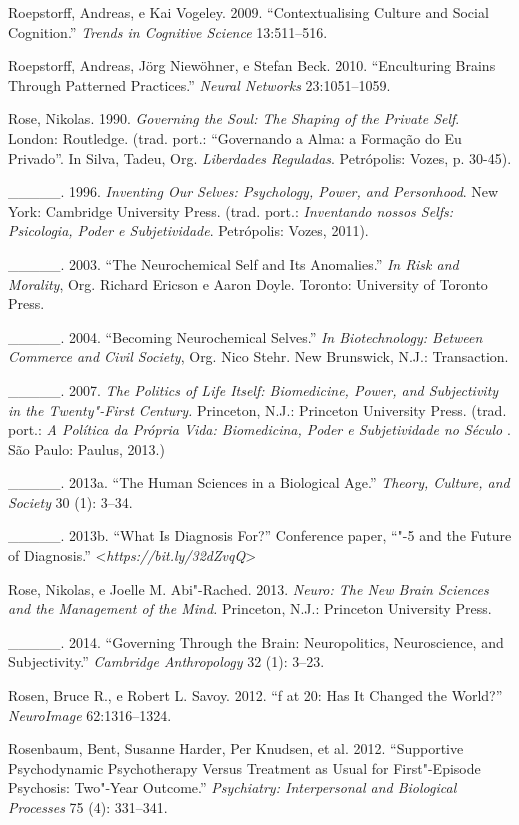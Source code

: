 {\begin{Parskip}
Roepstorff, Andreas, e Kai Vogeley. 2009. ``Contextualising Culture and
Social Cognition.'' \emph{Trends in Cognitive Science} 13:511--516.

Roepstorff, Andreas, Jörg Niewöhner, e Stefan Beck. 2010. ``Enculturing
Brains Through Patterned Practices.'' \emph{Neural Networks}
23:1051--1059.

Rose, Nikolas. 1990. \emph{Governing the Soul: The Shaping of the
Private Self}. London: Routledge. (trad. port.: ``Governando a Alma: a
Formação do Eu Privado''. In Silva, Tadeu, Org. \emph{Liberdades
Reguladas}. Petrópolis: Vozes, p. 30-45).

\_\_\_\_\_. 1996. \emph{Inventing Our Selves: Psychology, Power, and
Personhood}. New York: Cambridge University Press. (trad. port.:
\emph{Inventando nossos Selfs: Psicologia, Poder e Subjetividade}.
Petrópolis: Vozes, 2011).

\_\_\_\_\_. 2003. ``The Neurochemical Self and Its Anomalies.'' \emph{In
Risk and Morality}, Org. Richard Ericson e Aaron Doyle. Toronto:
University of Toronto Press.

\_\_\_\_\_. 2004. ``Becoming Neurochemical Selves.'' \emph{In
Biotechnology: Between Commerce and Civil Society}, Org. Nico Stehr. New
Brunswick, N.J.: Transaction.

\_\_\_\_\_. 2007. \emph{The Politics of Life Itself: Biomedicine, Power,
and Subjectivity in the Twenty"-First Century.} Princeton, N.J.:
Princeton University Press. (trad. port.: \emph{A Política da Própria
Vida: Biomedicina, Poder e Subjetividade no Século }. São Paulo:
Paulus, 2013.)

\_\_\_\_\_. 2013a. ``The Human Sciences in a Biological Age.''
\emph{Theory, Culture, and Society} 30 (1): 3--34.

\_\_\_\_\_. 2013b. ``What Is Diagnosis For?'' Conference paper, ``"-5
and the Future of Diagnosis.''
\textless{}\emph{https://bit.ly/32dZvqQ}\textgreater{}

Rose, Nikolas, e Joelle M. Abi"-Rached. 2013. \emph{Neuro: The New Brain
Sciences and the Management of the Mind.} Princeton, N.J.: Princeton
University Press.

\_\_\_\_\_. 2014. ``Governing Through the Brain: Neuropolitics,
Neuroscience, and Subjectivity.'' \emph{Cambridge Anthropology} 32 (1):
3--23.

Rosen, Bruce R., e Robert L. Savoy. 2012. ``f at 20: Has It Changed
the World?'' \emph{NeuroImage} 62:1316--1324.

Rosenbaum, Bent, Susanne Harder, Per Knudsen, et al. 2012. ``Supportive
Psychodynamic Psychotherapy Versus Treatment as Usual for First"-Episode
Psychosis: Two"-Year Outcome.'' \emph{Psychiatry: Interpersonal and
Biological Processes} 75 (4): 331--341.


\end{Parskip}}
